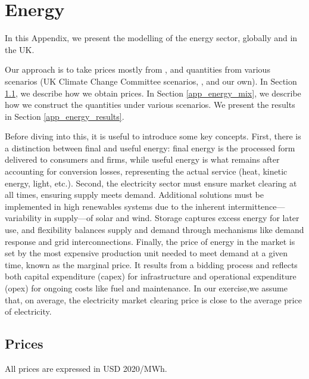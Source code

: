 \section{Energy}
\label{appendix:energy}

In this Appendix, we present the modelling of the energy sector, globally and in the UK. 

Our approach is to take prices mostly from \citet{wayEmpiricallyGroundedTechnology2022}, and quantities from various scenarios (UK Climate Change Committee scenarios, \citet{wayEmpiricallyGroundedTechnology2022}, and our own). In Section \ref{app_energy_prices}, we describe how we obtain prices. In Section \ref{app_energy_mix}, we describe how we construct the quantities under various scenarios. We present the results in Section \ref{app_energy_results}.

Before diving into this, it is useful to introduce some key concepts. First, there is a distinction between final and useful energy: final energy is the processed form delivered to consumers and firms, while useful energy is what remains after accounting for conversion losses, representing the actual service (heat, kinetic energy, light, etc.). Second, the electricity sector must ensure market clearing at all times, ensuring supply meets demand. Additional solutions must be implemented in high renewables systems due to the inherent intermittence—variability in supply—of solar and wind. Storage captures excess energy for later use, and flexibility balances supply and demand through mechanisms like demand response and grid interconnections. Finally, the price of energy in the market is set by the most expensive production unit needed to meet demand at a given time, known as the marginal price. It results from a bidding process and reflects both capital expenditure (capex) for infrastructure and operational expenditure (opex) for ongoing costs like fuel and maintenance. In our exercise,we assume that, on average, the electricity market clearing price is close to the average price  of electricity.




\subsection{Prices}
\label{app_energy_prices}

All prices are expressed in USD 2020/MWh. 

